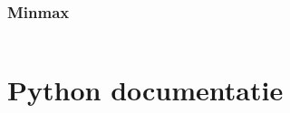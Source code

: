 \documentclass{article}
\begin{document}
    
    \inputminted{python}{../2021/beleefd/oplossing.py3}
    
    

    

    \section{Minmax}
    \inputminted{python}{../2022/minmax/oplossing.py3}

    \part{Python documentatie}
    
    
\end{document}
